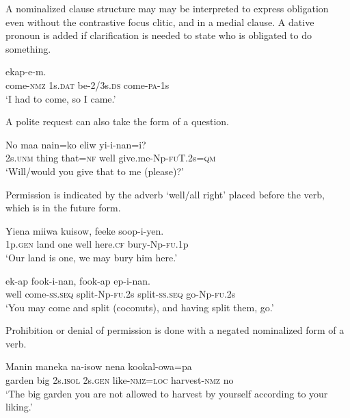 A nominalized clause structure may may be interpreted to express obligation even without the contrastive focus clitic, and in a medial clause. A dative pronoun is added if clarification is needed to state who is obligated to do something. 

\ea%
\label{ex:x1079}
\gll {}      ekap-e-m. \\
come-\textsc{nmz}  1s.\textsc{dat}  be-2/3s.\textsc{ds}  come-\textsc{pa}-1s\\
\glt `I had to come, so I came.'
\z

A polite request can also take the form of a question.

\ea%
\label{ex:x1163}
\gll No  maa  nain=ko  eliw  yi-i-nan=i? \\
2s.\textsc{unm}  thing  that=\textsc{nf}  well  give.me-Np-\textsc{fu}T.2s=\textsc{qm}\\
\glt `Will/would you give that to me (please)?'
\z

Permission is indicated by the adverb  `well/all right' placed before the verb, which is in the future form.

\ea%
\label{ex:x1085}
\gll Yiena  miiwa  kuisow,    feeke  soop-i-yen. \\
1p.\textsc{gen}  land  one  well  here.\textsc{cf}  bury-Np-\textsc{fu}.1p\\
\glt `Our land is one, we may bury him here.'
\z

\ea%
\label{ex:x1086}
\gll {}  ek-ap  fook-i-nan,  fook-ap  ep-i-nan. \\
well  come-\textsc{ss}.\textsc{seq}  split-Np-\textsc{fu}.2s  split-\textsc{ss}.\textsc{seq}  go-Np-\textsc{fu}.2s\\
\glt `You may come and split (coconuts), and having split them, go.'
\z

Prohibition or denial of permission is done with a negated nominalized form of a verb.

\ea%
\label{ex:x1087}
\gll Manin  maneka  na-isow  nena  kookal-owa=pa    \\
garden  big  2s.\textsc{isol}  2s.\textsc{gen}  like-\textsc{nmz}=\textsc{loc}  harvest-\textsc{nmz} no\\
\glt `The big garden you are not allowed to harvest by yourself according to your liking.'
\z

